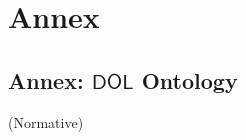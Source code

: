 \documentclass[10pt,fleqn,final]{scrreprt}
\makeatletter
\newcommand*\CommentAuthor{}
\renewcommand*\CommentAuthor{#1}}
\newcommand*\CommentDate{}
\renewcommand*\CommentDate{#1}}
\newcommand*\CommentId{}
\renewcommand*\CommentId{#1}}
\newcommand*\CommentType{}
\renewcommand*\CommentType{#1}}
\newcommand*{\SetCommentColorByType}[1]{%
\edef\localType{{#1}}%
\expandafter\ifstrequal\localType{q-aut}{\colorlet{CommentColor}{red}}{%
\expandafter\ifstrequal\localType{q-all}{\colorlet{CommentColor}{orange}}{%
\expandafter\ifstrequal\localType{todo}{\colorlet{CommentColor}{orange}}{%
\expandafter\ifstrequal\localType{fyi}{\colorlet{CommentColor}{lightgray}}{%
\colorlet{CommentColor}{yellow}}}}}}
\newcommand*{\SetCommentPrefixByType}[1]{%
\edef\localType{{#1}}%
\expandafter\@ifmtarg\localType{%
\edef\CommentPrefix{}%
}{%
\caseupper[q]{#1}%
\edef\CommentPrefix{\thestring: }%
}}
\newcommand*{\initComment}[1]{%
\setkeys{Comment}{#1}%
\SetCommentColorByType{\CommentType}%
\relax%
\SetCommentPrefixByType{\CommentType}%
\relax%
}
\newcommand*{\todonote}[2][]{%
\initComment{#1}%
\pdfcomment[author=\CommentAuthor,color=CommentColor,date=\CommentDate,id=\CommentId]{%
\CommentPrefix
#2}}
\renewcommand*{\todonote}[2][]{%
\initComment{#1}%
\ednote{\CommentPrefix #2}}
\newcommand*{\CL}{\ensuremath{\mathsf{CL}}\xspace}
\newcommand*{\DOL}{\ensuremath{\mathsf{DOL}}\xspace}
\newcommand{\normative}[0]{{\begin{center}{\Large{(Normative})}\end{center}} \bigskip}
\newcommand{\sclause}[1]{\section{#1}}
\newcommand{\normannex}[1]{ \chapter{Annex: #1} \normative}
\newenvironment{definitions}[0]{\medskip }{}
\makeatother
\begin{document}
\begin{definitions}
%
%






\part*{Annex}

\appendix

\normannex{\DOL Ontology}
\label{a:dol-onto}




\end{definitions}
\end{document}
